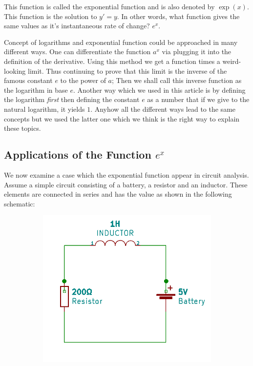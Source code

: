 \documentclass{article}
\begin{document}
	This function is called the exponential function and is also denoted by \boldmath$\exp(x)$. This function is the solution to \textit{$y' = y$}. In other words, what function gives the same values as it's instantaneous rate of change? $e^x$.
	
	Concept of logarithms and exponential function could be approached in many different ways. One can differentiate the function $a^x$ via plugging it into the definition of the derivative. Using this method we get a function times a weird-looking limit. Thus continuing to prove that this limit is the inverse of the famous constant $e$ to the power of $a$; Then we shall call this inverse function as the logarithm in base $e$. Another way which we used in this article is by defining the logarithm \textit{first} then defining the constant $e$ as a number that if we give to the natural logarithm, it yields $1$. Anyhow all the different ways lead to the same concepts but we used the latter one which we think is the right way to explain these topics.
	
	\subsection{Applications of the Function $e^x$}
	We now examine a case which the exponential function appear in circuit analysis. Assume a simple circuit consisting of a battery, a resistor and an inductor. These elements are connected in series and has the value as shown in the following schematic:
	\begin{figure}[h!]
 	\centering
	\begin{subfigure}[b]{0.6\linewidth}
		\includegraphics[width=\linewidth]{circuit1.png}
	\end{subfigure}
	\end{figure}
	
\end{document}
